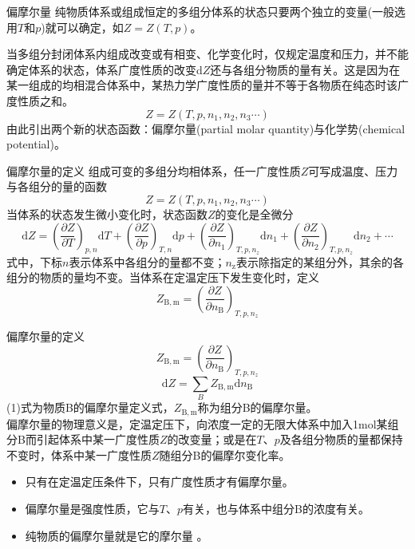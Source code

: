 \begin{frame}{偏摩尔量}
     纯物质体系或组成恒定的多组分体系的状态只要两个独立的变量(一般选用$T$和$p$)就可以确定，如$Z=Z(T,p)$。

     当多组分封闭体系内组成改变或有相变、化学变化时，仅规定温度和压力，并不能确定体系的状态，体系广度性质的改变d$Z$还与各组分物质的量有关。这是因为在某一组成的均相混合体系中，某热力学广度性质的量并不等于各物质在纯态时该广度性质之和。
     $$Z = Z(T,p,n_1,n_2,n_3\cdots )$$
     由此引出两个新的状态函数：偏摩尔量(partial molar quantity)与化学势(chemical potential)。
\end{frame}


\begin{frame}{偏摩尔量的定义}
    组成可变的多组分均相体系，任一广度性质$Z$可写成温度、压力与各组分的量的函数
    $$Z = Z(T,p,n_1,n_2,n_3\cdots )$$
    当体系的状态发生微小变化时，状态函数$Z$的变化是全微分
    $$\mathrm{d}Z=\left(\frac{\partial Z}{\partial T}\right)_{p,n}\mathrm{d}T + \left(\frac{\partial Z}{\partial p}\right)_{T,n}\mathrm{d}p + \left(\frac{\partial Z}{\partial n_1}\right)_{T,p,n_z}\mathrm{d}n_1 + \left(\frac{\partial Z}{\partial n_2}\right)_{T,p,n_z}\mathrm{d}n_2 + \cdots$$
    式中，下标$n$表示体系中各组分的量都不变；$n_\mathrm{z}$表示除指定的某组分外，其余的各组分的物质的量均不变。当体系在定温定压下发生变化时，定义
    $$Z_{\mathrm{B,m}}=\left(\frac{\partial Z}{\partial n_\mathrm{B}}\right)_{T,p,n_z}$$
\end{frame}


\begin{frame}{偏摩尔量的定义}
    $$Z_{\mathrm{B,m}}=\left(\frac{\partial Z}{\partial n_\mathrm{B}}\right)_{T,p,n_z}$$
    $$\mathrm{d}Z=\sum_B{Z_\mathrm{B,m}}\mathrm{d}n_\mathrm{B}$$
    (1)式为物质B的偏摩尔量定义式，$Z_{\mathrm{B,m}}$称为组分B的偏摩尔量。
    \\偏摩尔量的物理意义是，定温定压下，向浓度一定的无限大体系中加入1mol某组分B而引起体系中某一广度性质$Z$的改变量；或是在$T$、$p$及各组分物质的量都保持不变时，体系中某一广度性质$Z$随组分B的偏摩尔变化率。

    \begin{itemize}
      \item 只有在定温定压条件下，只有广度性质才有偏摩尔量。
      \item 偏摩尔量是强度性质，它与$T$、$p$有关，也与体系中组分B的浓度有关。
      \item 纯物质的偏摩尔量就是它的摩尔量 。
    \end{itemize}
    
\end{frame}


